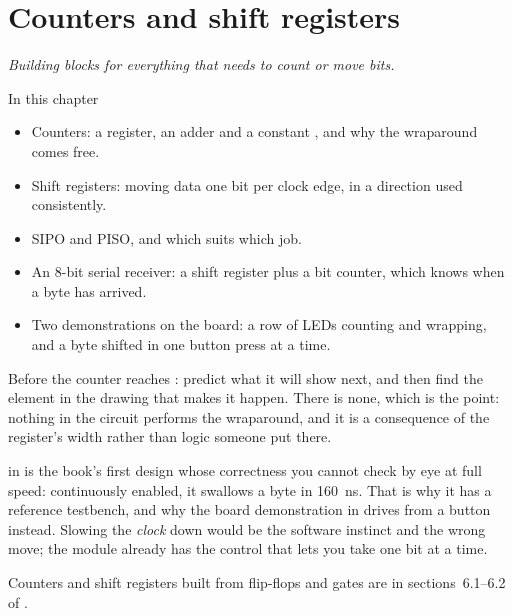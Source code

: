 
\chapter{Counters and shift registers}
\label{c6:ch}

{\large\itshape Building blocks for everything that needs to count or move bits.\par}

\begin{chapterbox}{In this chapter}
\begin{itemize}
  \item Counters: a register, an adder and a constant , and why the wraparound comes free.
  \item Shift registers: moving data one bit per clock edge, in a direction used consistently.
  \item SIPO and PISO, and which suits which job.
  \item An 8-bit serial receiver: a shift register plus a bit counter, which knows when a byte has
    arrived.
  \item Two demonstrations on the board: a row of LEDs counting and wrapping, and a byte shifted in
    one button press at a time.
\end{itemize}
\end{chapterbox}

Before the counter reaches : predict what it will show next, and then find the element in
the drawing that makes it happen. There is none, which is the point: nothing in the circuit performs
the wraparound, and it is a consequence of the register's width rather than logic someone put there.

 in  is the book's first design whose correctness you cannot
check by eye at full speed: continuously enabled, it swallows a byte in 160~ns. That is why it has a
reference testbench, and why the board demonstration in  drives
 from a button instead. Slowing the \emph{clock} down would be the software
instinct and the wrong move; the module already has the control that lets you take one bit at a
time.

\note[Refresher] Counters and shift registers built from flip-flops and gates are in
sections~6.1--6.2 of \debook{}.




